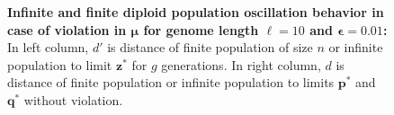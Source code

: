 \begin{figure}[h]
\begin{center}
\hspace{-3em}%
\vspace{-0.5em}  \hspace{-3em}%


\caption[\textbf{Infinite and finite diploid population oscillation behavior in case of violation in $\bm{\mu}$ for genome length $\ell = 10$ and $\bm{\epsilon} = 0.01$}]{\textbf{Infinite and finite diploid population oscillation behavior in case of violation in $\bm{\mu}$ for genome length $\ell = 10$ and $\bm{\epsilon} = 0.01$:} 
  In left column, $d'$ is distance of finite population of size $n$ or infinite population to limit $\bm{z}^\ast$ for $g$ generations. In right column, $d$ is distance of finite population or infinite population to limits $\bm{p}^\ast$ and $\bm{q}^\ast$ without violation.}
\label{oscillation_10d_vio_mu_0.01}
\end{center}
\end{figure}

